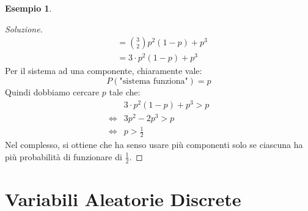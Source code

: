 \documentclass{article}
\theoremstyle{plain}
\theoremstyle{definition}
\newtheorem{esempio}{Esempio}[section]
\theoremstyle{remark}
\newenvironment{soluzione}
	{\renewcommand\qedsymbol{$\mathwitch*$}\begin{proof}[Soluzione]}
	{\end{proof}}
\renewcommand{\qedsymbol}{$\mathrightghost$}
\begin{document}
\begin{esempio}
\begin{soluzione}
\begin{align*}
			&=\binom{3}{2}p^2 (1-p)+p^3\\
			&=3\cdot p^2 (1-p)+p^3
		\end{align*}
		Per il sistema ad una componente, chiaramente vale:
		\begin{equation*}
			P(\text{"sistema funziona"})=p
		\end{equation*}
		Quindi dobbiamo cercare $p$ tale che:
		\begin{align*}
			&3\cdot p^2 (1-p)+p^3>p\\
			\Leftrightarrow&3p^2-2p^3>p\\
			\Leftrightarrow&p>\frac{1}{2}
		\end{align*}
		Nel complesso, si ottiene che ha senso usare più componenti solo se ciascuna ha più probabilità di funzionare di $\frac{1}{2}$.
	\end{soluzione}
\end{esempio}
\section{Variabili Aleatorie Discrete} %
\label{sec:variabili_aleatorie_discrete}
\end{document}
